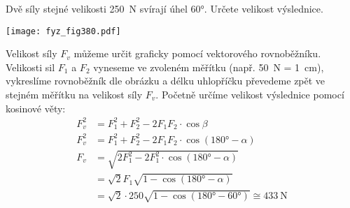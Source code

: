 \begin{example}\label{fyz:fey_exam012}
  Dvě síly stejné velikosti \SI{250}{\newton} svírají úhel \ang{60}. Určete velikost výslednice.
      
  {\centering
   \captionsetup{type=figure}
   \texttt{[image: fyz\_fig380.pdf]}
  \par}
  
  Velikost síly \(F_v\) můžeme určit graficky pomocí vektorového rovnoběžníku. Velikosti sil 
  \(F_1\) a \(F_2\) vyneseme ve zvoleném měřítku (např. \SI{50}{\newton} = \SI{1}{\cm}), vykreslíme 
  rovnoběžník dle obrázku a délku uhlopříčku převedeme zpět ve stejném měřítku na velikost síly 
  \(F_v\). Početně určíme velikost výslednice pomocí kosinové věty: 
  \begin{align*}
     F_v^2 &= F_1^2 + F_2^2 - 2F_1F_2\cdot\cos\beta \\
     F_v^2 &= F_1^2 + F_2^2 - 2F_1F_2\cdot\cos(\ang{180}- \alpha) \\
     F_v   &= \sqrt{2F_1^2 - 2F_1^2\cdot\cos(\ang{180}- \alpha)}  \\
         &= \sqrt{2}F_1\sqrt{1-\cos(\ang{180}- \alpha)}         \\
         &= \sqrt{2}\cdot250\sqrt{1-\cos(\ang{180} - \ang{60})} 
            \cong \SI{433}{\newton}
  \end{align*}

\end{example}